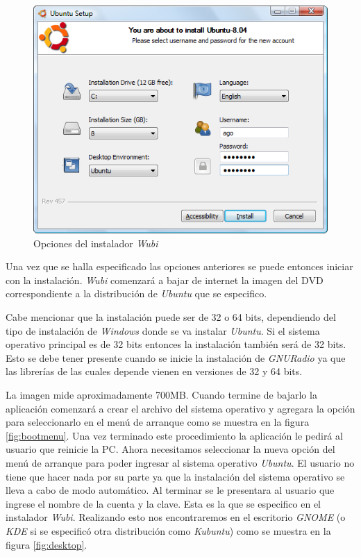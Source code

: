 \begin{figure}[hpt]
\centering
	\includegraphics[scale=0.5]{figs/wubi}
	\caption{Opciones del instalador \emph{Wubi}}
	\label{fig:wubi}
\end{figure}

Una vez que se halla especificado las opciones anteriores se puede entonces
iniciar con la instalaci\'on. \emph{Wubi} comenzar\'a a bajar de internet la
imagen del DVD correspondiente a la distribuci\'on de \emph{Ubuntu} que se
especifico.

Cabe mencionar que la instalaci\'on puede ser de 32 o 64 bits, dependiendo del
tipo de instalaci\'on de \emph{Windows} donde se va instalar \emph{Ubuntu}. Si
el sistema operativo principal es de 32 bits entonces la instalaci\'on tambi\'en
ser\'a de 32 bits. Esto se debe tener presente cuando se inicie la instalaci\'on
de \emph{GNURadio} ya que las librer\'ias de las cuales depende vienen en
versiones de 32 y 64 bits.

La imagen mide aproximadamente 700MB. Cuando termine de bajarlo la aplicaci\'on
comenzar\'a a crear el archivo del sistema operativo y agregara la opci\'on para
seleccionarlo en el men\'u de arranque como se muestra en la figura
\ref{fig:bootmenu}. Una vez terminado este procedimiento la aplicaci\'on le
pedir\'a al usuario que reinicie la PC. Ahora necesitamos seleccionar la nueva opci\'on del men\'u
de arranque para poder ingresar al sistema operativo \emph{Ubuntu}. El usuario no tiene que hacer
nada por su parte ya que la instalaci\'on del sistema operativo se lleva a cabo
de modo autom\'atico. Al terminar se le presentara al usuario que ingrese el
nombre de la cuenta y la clave. Esta es la que se especifico en el instalador
\emph{Wubi}. Realizando esto nos encontraremos en el escritorio \emph{GNOME} (o
\emph{KDE} si se especific\'o otra distribuci\'on como \emph{Kubuntu}) como se
muestra en la figura \ref{fig:desktop}.

